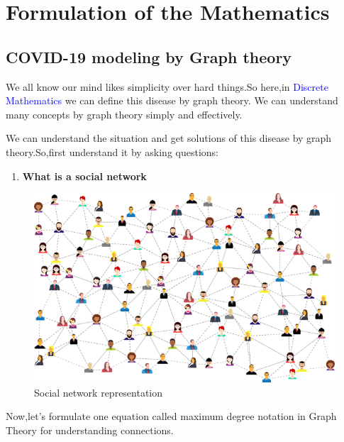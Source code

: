 \documentclass[12pt]{article}
\begin{document}
\newpage
\section{Formulation of the Mathematics}
\subsection{COVID-19 modeling by Graph theory}
\par  We all know our mind likes simplicity over hard things.So here,in \textcolor{blue}{Discrete Mathematics} we can define this disease by graph theory.
We can understand many concepts by graph theory simply and effectively.\\
\par  We can understand the situation and get solutions of this disease by graph theory.So,first understand it by asking questions:\\
\begin{enumerate}

\item {\bf{What is a social network}}
\end{enumerate}
\begin{figure}[h]
\includegraphics[width=\textwidth]{social-media-3846597_640.png}
\caption{Social network representation\cite{nj5}}
\end{figure}
\par Now,let's formulate one equation called maximum degree notation in Graph Theory for understanding connections.
\newpage
\end{document}
